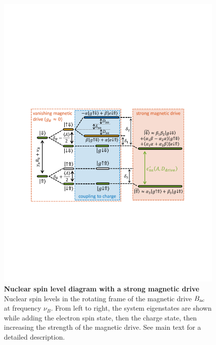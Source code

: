 \begin{figure}
	\centering
	\includegraphics[width=\columnwidth]{fig2_levels}
	\caption[Nuclear spin level diagram with a strong magnetic drive]{\textbf{Nuclear spin level diagram with a strong magnetic drive}
 		Nuclear spin levels in the rotating frame of the magnetic drive $B_{\rm ac}$ at frequency $\nu_B$. From left to right, the system eigenstates are shown while adding the electron spin state, then the charge state, then increasing the strength of the magnetic drive. See main text for a detailed description.}
	\label{fig:levels}
\end{figure}

